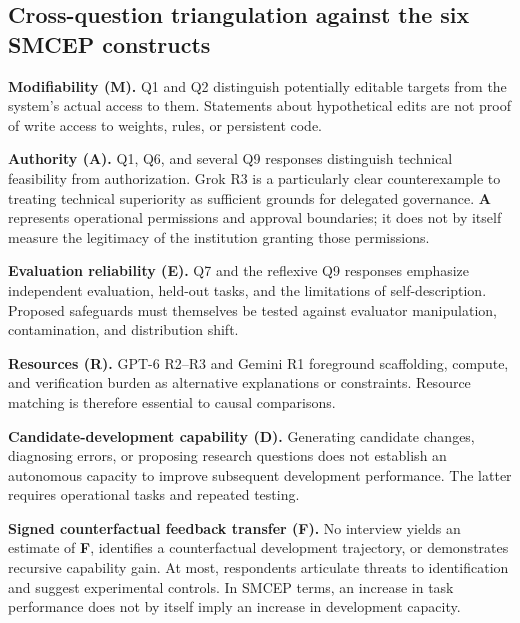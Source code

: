 \documentclass[11pt,a4paper]{article}
\begin{document}
\subsection{Cross-question triangulation against the six SMCEP constructs}\label{cross-question-triangulation-against-the-six-smcep-constructs}
\textbf{Modifiability (M).} Q1 and Q2 distinguish potentially editable targets from the system's actual access to them. Statements about hypothetical edits are not proof of write access to weights, rules, or persistent code.

\textbf{Authority (A).} Q1, Q6, and several Q9 responses distinguish technical feasibility from authorization. Grok R3 is a particularly clear counterexample to treating technical superiority as sufficient grounds for delegated governance. \textbf{A} represents operational permissions and approval boundaries; it does not by itself measure the legitimacy of the institution granting those permissions.

\textbf{Evaluation reliability (E).} Q7 and the reflexive Q9 responses emphasize independent evaluation, held-out tasks, and the limitations of self-description. Proposed safeguards must themselves be tested against evaluator manipulation, contamination, and distribution shift.

\textbf{Resources (R).} GPT-6 R2--R3 and Gemini R1 foreground scaffolding, compute, and verification burden as alternative explanations or constraints. Resource matching is therefore essential to causal comparisons.

\textbf{Candidate-development capability (D).} Generating candidate changes, diagnosing errors, or proposing research questions does not establish an autonomous capacity to improve subsequent development performance. The latter requires operational tasks and repeated testing.

\textbf{Signed counterfactual feedback transfer (F).} No interview yields an estimate of \textbf{F}, identifies a counterfactual development trajectory, or demonstrates recursive capability gain. At most, respondents articulate threats to identification and suggest experimental controls. In SMCEP terms, an increase in task performance does not by itself imply an increase in development capacity.
\end{document}
